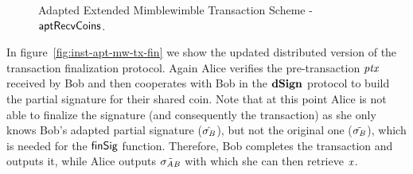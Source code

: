 \begin{figure}
    \begin{center}
    \end{center}
    \caption{Adapted Extended Mimblewimble Transaction Scheme - $\mathsf{aptRecvCoins}$. \label{fig:inst-apt-mw-tx-recv}}
\end{figure}

In figure~\cref{fig:inst-apt-mw-tx-fin} we show the updated distributed version of the transaction finalization protocol.
Again Alice verifies the pre-transaction $\mathit{ptx}$ received by Bob and then cooperates with Bob in the $\mathbf{dSign}$ protocol to build the partial signature for their shared coin.
Note that at this point Alice is not able to finalize the signature (and consequently the transaction) as she only knows Bob's adapted partial signature ($\hat{\sigma_{\mathit{B}}}$), but not the original one ($\tilde{\sigma_{\mathit{B}}}$), which is needed for the $\mathsf{finSig}$ function.
Therefore, Bob completes the transaction and outputs it, while Alice outputs $\tilde{\sigma_{\mathit{A}\mathit{B}}}$ with which she can then retrieve $\mathit{x}$.

